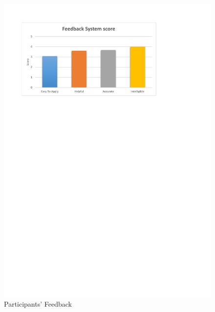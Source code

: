\begin{figure}[!htb]
	\centering
	\includegraphics[width=\textwidth]{charts/feedbacksystemfeedback.pdf}
	\caption[Participants' Feedback]{Participants' Feedback}
	\label{fig:chart-feedbacksystemfeedback}
\end{figure}

